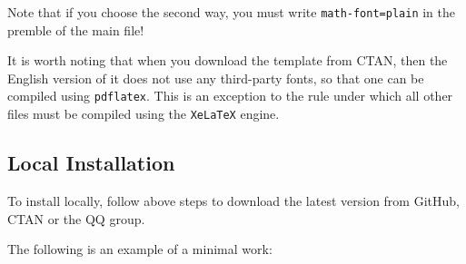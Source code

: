 \documentclass[lang=en,12pt]{beautybook}
\begin{document}
Note that if you choose the second way,  you must write \lstinline{math-font=plain} in the premble of the main file!

It is worth noting that when you download the template from CTAN, then the English version of it does not use any third-party fonts, so that one can be compiled using \texttt{pdflatex}. This is an exception to the rule under which all other files must be compiled using the \texttt{XeLaTeX} engine.

\subsection{Local Installation}

To install locally, follow above steps to download the latest version from GitHub, CTAN or the QQ group.

The following is an example of a minimal work:
\end{document}
